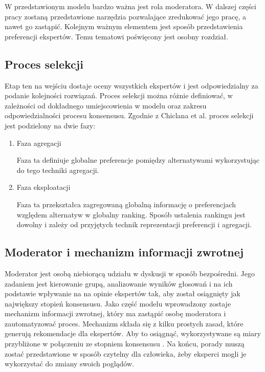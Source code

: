 W przedstawionym modelu bardzo ważna jest rola moderatora. W dalszej części 
pracy zostaną przedstawione narzędzia pozwalające zredukować jego pracę, a 
nawet go zastąpić. Kolejnym ważnym elementem jest sposób przedstawienia 
preferencji ekspertów. Temu tematowi poświęcony jest osobny rozdział.

\subsection{Proces selekcji}
Etap ten na wejściu dostaje oceny wszystkich ekspertów i jest odpowiedzialny za 
podanie kolejności rozwiązań. Proces selekcji można różnie definiować, w 
zależności od dokładnego umiejscowienia w modelu oraz zakresu odpowiedzialności 
procesu konsensusu. Zgodnie z Chiclana et al. \cite{Chiclana1998,Chiclana2001}
proces selekcji jest podzielony na dwie fazy:
\begin{enumerate}
  \item Faza agregacji
  
  Faza ta definiuje globalne preferencje pomiędzy alternatywami wykorzystując 
  do tego techniki agregacji.
  
  \item Faza eksploatacji
  
  Faza ta przekształca zagregowaną globalną informację o preferencjach względem 
  alternatyw w globalny ranking. Sposób ustalenia rankingu jest dowolny i zależy
  od przyjętych technik reprezentacji preferencji i agregacji.

\end{enumerate}

\subsection{Moderator i mechanizm informacji zwrotnej}
Moderator jest osobą niebiorącą udziału w dyskusji w sposób bezpośredni. Jego
zadaniem jest kierowanie grupą, analizowanie wyników głosowań i na ich podstawie
wpływanie na na opinie ekspertów tak, aby został osiągnięty jak największy 
stopień konsensusu. Jako część modelu wprowadzony zostaje mechanizm informacji 
zwrotnej, który ma zastąpić osobę moderatora i zautomatyzować proces. Mechanizm 
składa się z kilku prostych zasad, które generują rekomendacje dla ekspertów. 
Aby to osiągnąć, wykorzystywane są miary przybliżone w połączeniu ze stopniem 
konsensusu \cite{Herrera1995}. Na końcu, porady muszą zostać przedstawione w
sposób czytelny dla człowieka, żeby eksperci mogli je wykorzystać do zmiany
swoich poglądów.


